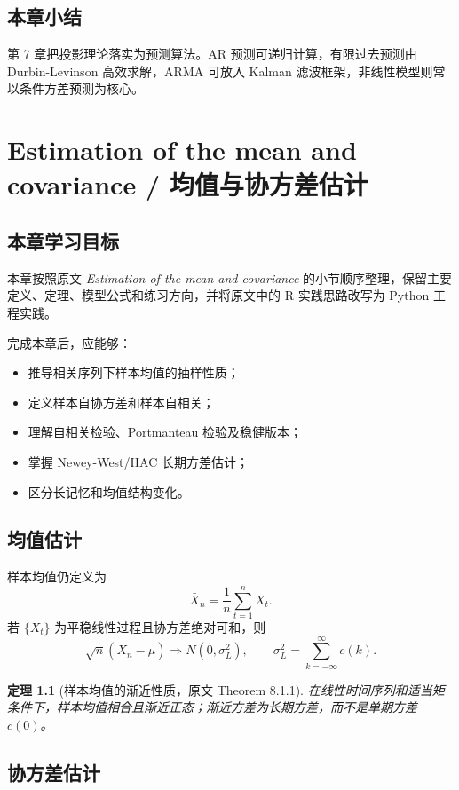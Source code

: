 \documentclass[11pt,a4paper,openany]{ctexbook}
\newtheorem{theorem}{定理}[section]
\begin{document}
\section*{本章小结}

第 7 章把投影理论落实为预测算法。AR 预测可递归计算，有限过去预测由 Durbin-Levinson 高效求解，ARMA 可放入 Kalman 滤波框架，非线性模型则常以条件方差预测为核心。

\clearpage
\chapter{Estimation of the mean and covariance / 均值与协方差估计}
\section*{本章学习目标}

本章按照原文 \textit{Estimation of the mean and covariance} 的小节顺序整理，保留主要定义、定理、模型公式和练习方向，并将原文中的 R 实践思路改写为 Python 工程实践。

完成本章后，应能够：
\begin{itemize}
  \item 推导相关序列下样本均值的抽样性质；
  \item 定义样本自协方差和样本自相关；
  \item 理解自相关检验、Portmanteau 检验及稳健版本；
  \item 掌握 Newey-West/HAC 长期方差估计；
  \item 区分长记忆和均值结构变化。
\end{itemize}

\section{均值估计}

样本均值仍定义为
\[
  \bar X_n=\frac1n\sum_{t=1}^n X_t.
\]
若 \(\{X_t\}\) 为平稳线性过程且协方差绝对可和，则
\[
  \sqrt n(\bar X_n-\mu)\Rightarrow N(0,\sigma_L^2),
\qquad
  \sigma_L^2=\sum_{k=-\infty}^{\infty}c(k).
\]
\begin{theorem}[样本均值的渐近性质，原文 Theorem 8.1.1]
在线性时间序列和适当矩条件下，样本均值相合且渐近正态；渐近方差为长期方差，而不是单期方差 \(c(0)\)。
\end{theorem}

\section{协方差估计}
\end{document}
